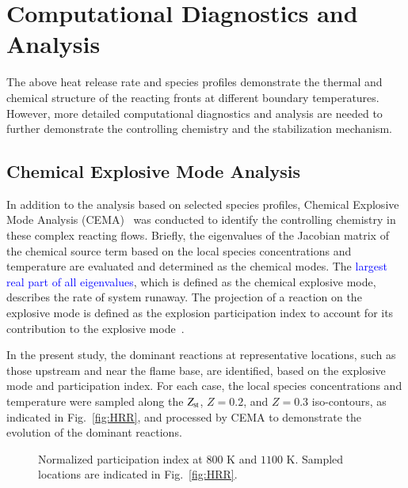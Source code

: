 \documentclass[review,3p,times]{elsarticle}
\begin{document}
\section{Computational Diagnostics and Analysis} \label{sec:diagnostics}
The above heat release rate and species profiles demonstrate the thermal and chemical structure of the reacting fronts at different boundary temperatures.  However, more detailed computational diagnostics and analysis are needed to further demonstrate the controlling chemistry and the stabilization mechanism.
\subsection{Chemical Explosive Mode Analysis}
In addition to the analysis based on selected species profiles, Chemical Explosive Mode Analysis (CEMA)~\cite{lu10,shan12} was conducted to identify the controlling chemistry in these complex reacting flows.  Briefly, the eigenvalues of the Jacobian matrix of the chemical source term based on the local species concentrations and temperature are evaluated and determined as the chemical modes.  The \textcolor{blue}{largest real part of all eigenvalues}, which is defined as the chemical explosive mode, describes the rate of system runaway.  The projection of a reaction on the explosive mode is defined as the explosion participation index to account for its contribution to the explosive mode\textcolor{blue}{~\cite{shan12}}.  

In the present study, the dominant reactions at representative locations, such as those upstream and near the flame base, are identified, based on the explosive mode and participation index.  For each case, the local species concentrations and temperature were sampled along the $Z_{\rm st}$, $Z = 0.2$, and $Z = 0.3$ iso-contours, as indicated in Fig.~\ref{fig:HRR}, and processed by CEMA to demonstrate the evolution of the dominant reactions.

\begin{figure}
  \centering
  \scriptsize
  
  
  \normalsize
  \caption{Normalized participation index at $800$ K and $1100$ K.  Sampled locations are indicated in Fig.~\ref{fig:HRR}.}
  \label{fig:CEMA}
\end{figure}
\end{document}
